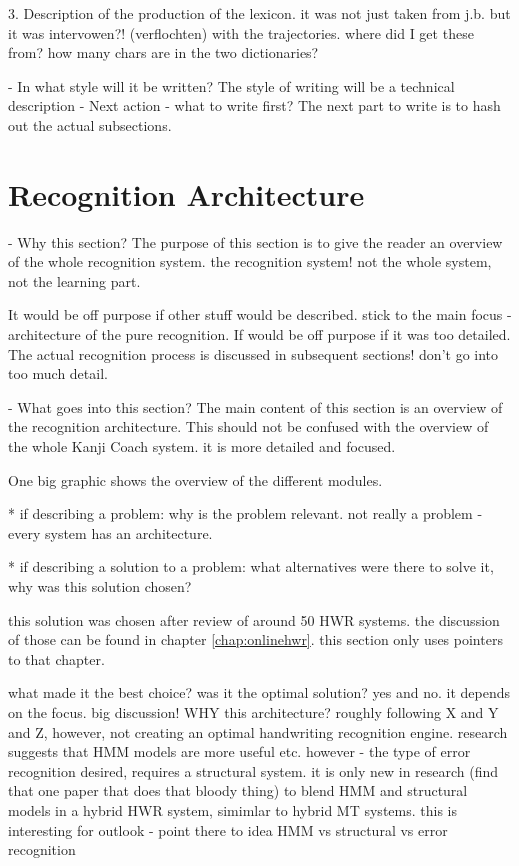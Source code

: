   3. Description of the production of the lexicon.
     it was not just taken from j.b. but it was intervowen?! (verflochten) 
     with the trajectories. where did I get these from? 
     how many chars are in the two dictionaries?

- In what style will it be written?
  The style of writing will be a technical description
- Next action - what to write first?
  The next part to write is to hash out the actual subsections.

\section{Recognition Architecture}
\label{sec:hwre:recognitionarchitecture}

- Why this section? 
  The purpose of this section is to give the reader an overview of the whole
  recognition system. the recognition system! not the whole system, 
  not the learning part.

  It would be off purpose if other stuff would be described.
  stick to the main focus - architecture of the pure recognition.
  If would be off purpose if it was too detailed.
  The actual recognition process is discussed in subsequent sections!
  don't go into too much detail.

- What goes into this section?
  The main content of this section is an overview of the recognition 
  architecture. This should not be confused with the overview of the
  whole Kanji Coach system. it is more detailed and focused.

  One big graphic shows the overview of the different modules.
  
  * if describing a problem: why is the problem relevant.
    not really a problem - every system has an architecture.
   

  * if describing a solution to a problem: what alternatives were
    there to solve it, why was this solution chosen? 

    this solution was chosen after review of around 50 HWR systems.
    the discussion of those can be found in chapter \ref{chap:onlinehwr}.
    this section only uses pointers to that chapter.

    what made it the best choice? was it the optimal solution?
    yes and no.
    it depends on the focus.
    big discussion! WHY this architecture?
    roughly following X and Y and Z,
    however, not creating an optimal handwriting recognition engine.
    research suggests that HMM models are more useful etc.
    however - the type of error recognition desired,
    requires a structural system.
    it is only new in research (find that one paper 
    that does that bloody thing) to blend HMM and structural models
    in a hybrid HWR system, simimlar to hybrid MT systems.
    this is interesting for outlook - point there to idea
    HMM vs structural vs error recognition

